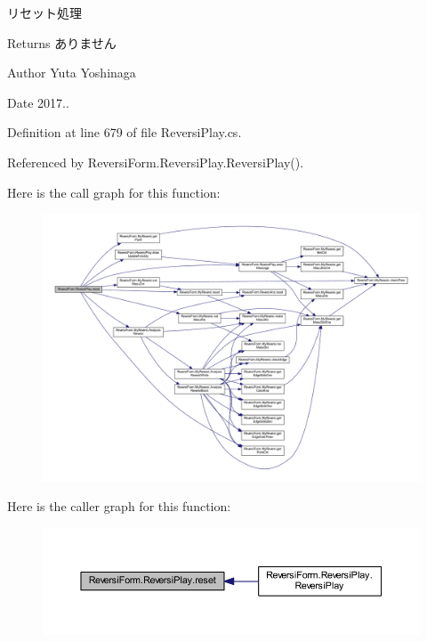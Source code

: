 リセット処理 

\begin{DoxyReturn}{Returns}
ありません 
\end{DoxyReturn}
\begin{DoxyAuthor}{Author}
Yuta Yoshinaga 
\end{DoxyAuthor}
\begin{DoxyDate}{Date}
2017.. 
\end{DoxyDate}


Definition at line 679 of file Reversi\+Play.\+cs.



Referenced by Reversi\+Form.\+Reversi\+Play.\+Reversi\+Play().

Here is the call graph for this function\+:
\nopagebreak
\begin{figure}[H]
\begin{center}
\leavevmode
\includegraphics[width=350pt]{class_reversi_form_1_1_reversi_play_a03997d634aa21a84e660e7f98aa27064_cgraph}
\end{center}
\end{figure}
Here is the caller graph for this function\+:
\nopagebreak
\begin{figure}[H]
\begin{center}
\leavevmode
\includegraphics[width=350pt]{class_reversi_form_1_1_reversi_play_a03997d634aa21a84e660e7f98aa27064_icgraph}
\end{center}
\end{figure}
\mbox{\label{class_reversi_form_1_1_reversi_play_a7f3822227e59fac0f998927a6566006e}} 
